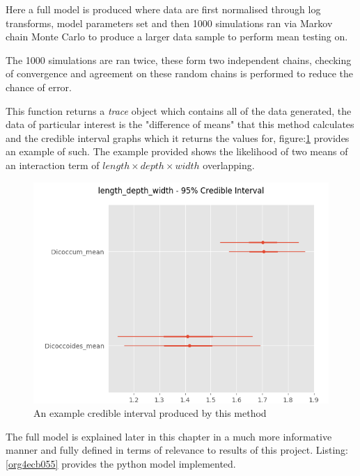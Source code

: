\documentclass[11pt]{report}
\begin{document}
Here a full model is produced where data are first normalised through log transforms, model parameters set and then 1000 simulations ran via Markov chain Monte Carlo to produce a larger data sample to perform mean testing on.

The 1000 simulations are ran twice, these form two independent chains, checking of convergence and agreement on these random chains is performed to reduce the chance of error.

This function returns a \emph{trace} object which contains all of the data generated, the data of particular interest is the "difference of means" that this method calculates and the credible interval graphs which it returns the values for, figure:\ref{fig:org0e6ec6c} provides an example of such. The example provided shows the likelihood of two means of an interaction term of
\(length \times  depth \times width\) overlapping.

\begin{figure}[htbp]
\centering
\includegraphics[width=15cm]{./images/ci.png}
\caption{\label{fig:org0e6ec6c}
An example credible interval produced by this method}
\end{figure}


The full model is explained later in this chapter in a much more informative manner and fully defined in terms of relevance to results of this project. Listing:\ref{org4ecb055} provides the python model implemented.
\end{document}
